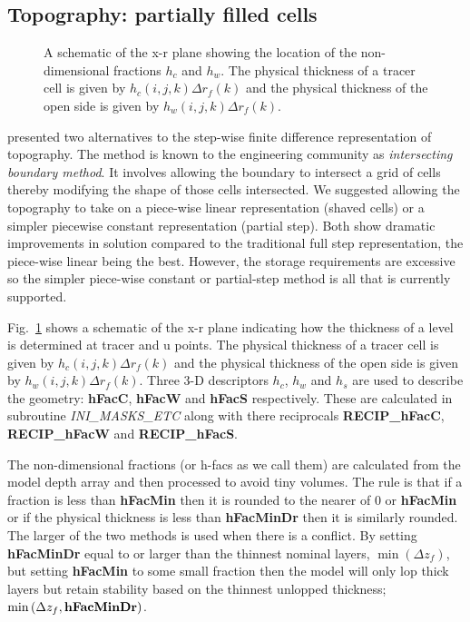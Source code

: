 \subsection{Topography: partially filled cells}

\begin{figure}
\begin{center}
\end{center}
\caption{
A schematic of the x-r plane showing the location of the
non-dimensional fractions $h_c$ and $h_w$. The physical thickness of a
tracer cell is given by $h_c(i,j,k) \Delta r_f(k)$ and the physical
thickness of the open side is given by $h_w(i,j,k) \Delta r_f(k)$.}
\label{fig:hfacs}
\end{figure}

\cite{Adcroft97} presented two alternatives to the step-wise finite
difference representation of topography. The method is known to the
engineering community as {\em intersecting boundary method}. It
involves allowing the boundary to intersect a grid of cells thereby
modifying the shape of those cells intersected. We suggested allowing
the topography to take on a piece-wise linear representation (shaved
cells) or a simpler piecewise constant representation (partial step).
Both show dramatic improvements in solution compared to the
traditional full step representation, the piece-wise linear being the
best. However, the storage requirements are excessive so the simpler
piece-wise constant or partial-step method is all that is currently
supported.

Fig.~\ref{fig:hfacs} shows a schematic of the x-r plane indicating how
the thickness of a level is determined at tracer and u points.
The physical thickness of a tracer cell is given by $h_c(i,j,k) \Delta
r_f(k)$ and the physical thickness of the open side is given by
$h_w(i,j,k) \Delta r_f(k)$. Three 3-D descriptors $h_c$, $h_w$ and
$h_s$ are used to describe the geometry: {\bf hFacC}, {\bf hFacW} and
{\bf hFacS} respectively. These are calculated in subroutine {\em
INI\_MASKS\_ETC} along with there reciprocals {\bf RECIP\_hFacC}, {\bf
RECIP\_hFacW} and {\bf RECIP\_hFacS}.

The non-dimensional fractions (or h-facs as we call them) are
calculated from the model depth array and then processed to avoid tiny
volumes. The rule is that if a fraction is less than {\bf hFacMin}
then it is rounded to the nearer of $0$ or {\bf hFacMin} or if the
physical thickness is less than {\bf hFacMinDr} then it is similarly
rounded. The larger of the two methods is used when there is a
conflict. By setting {\bf hFacMinDr} equal to or larger than the
thinnest nominal layers, $\min{(\Delta z_f)}$, but setting {\bf
hFacMin} to some small fraction then the model will only lop thick
layers but retain stability based on the thinnest unlopped thickness;
$\min{(\Delta z_f,\mbox{\bf hFacMinDr})}$.

